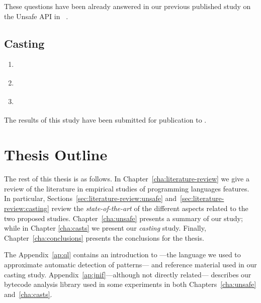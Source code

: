 These questions have been already answered in our previous published
study on the Unsafe API in \java{}~\citep{mastrangeloUseYourOwn2015}.

\subsection*{Casting}

\begin{enumerate}[label=$RQ/C\arabic*:$,leftmargin=3.4\parindent]
\item {\bf \crqA} \crqAdesc{}
\item {\bf \crqB} \crqBdesc{}
\item {\bf \crqC} \crqCdesc{}
\end{enumerate}

The results of this study have been submitted for publication to .


\section{Thesis Outline}

The rest of this thesis is as follows.
In Chapter~\ref{cha:literature-review} we give a review of the literature in empirical studies of programming languages features.
In particular, Sections~\ref{sec:literature-review:unsafe} and~\ref{sec:literature-review:casting} review the \emph{state-of-the-art} of the different aspects related to the two proposed studies.
Chapter~\ref{cha:unsafe} presents a summary of our \unsafe{} study;
while in Chapter \ref{cha:casts} we present our \emph{casting} study.
Finally, Chapter~\ref{cha:conclusions} presents the conclusions for the thesis.

The Appendix~\ref{ap:ql} contains an introduction to \ql{}%
---the language we used to approximate automatic detection of patterns---%
and reference material used in our casting study.
Appendix~\ref{ap:jnif}---although not directly related---%
describes our bytecode analysis library used in some experiments in both Chapters~\ref{cha:unsafe} and~\ref{cha:casts}.
